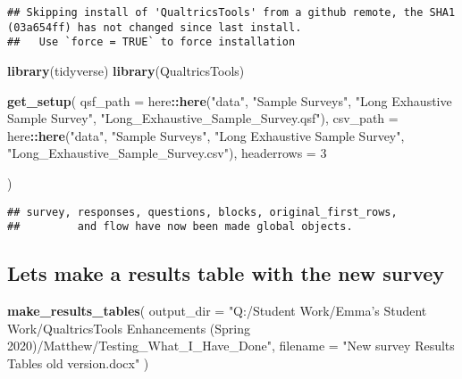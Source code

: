 \documentclass[
]{article}
\newenvironment{Shaded}{\begin{snugshade}}{\end{snugshade}}
\newcommand{\DataTypeTok}[1]{\textcolor[rgb]{0.13,0.29,0.53}{#1}}
\newcommand{\DecValTok}[1]{\textcolor[rgb]{0.00,0.00,0.81}{#1}}
\newcommand{\KeywordTok}[1]{\textcolor[rgb]{0.13,0.29,0.53}{\textbf{#1}}}
\newcommand{\NormalTok}[1]{#1}
\newcommand{\OperatorTok}[1]{\textcolor[rgb]{0.81,0.36,0.00}{\textbf{#1}}}
\newcommand{\StringTok}[1]{\textcolor[rgb]{0.31,0.60,0.02}{#1}}
\begin{document}
\begin{verbatim}
## Skipping install of 'QualtricsTools' from a github remote, the SHA1 (03a654ff) has not changed since last install.
##   Use `force = TRUE` to force installation
\end{verbatim}

\begin{Shaded}
\begin{Highlighting}[]
\KeywordTok{library}\NormalTok{(tidyverse)}
\KeywordTok{library}\NormalTok{(QualtricsTools)}

\KeywordTok{get_setup}\NormalTok{(}
  \DataTypeTok{qsf_path =}\NormalTok{ here}\OperatorTok{::}\KeywordTok{here}\NormalTok{(}\StringTok{"data"}\NormalTok{, }\StringTok{"Sample Surveys"}\NormalTok{, }\StringTok{"Long Exhaustive Sample Survey"}\NormalTok{, }\StringTok{"Long_Exhaustive_Sample_Survey.qsf"}\NormalTok{),}
  \DataTypeTok{csv_path =}\NormalTok{ here}\OperatorTok{::}\KeywordTok{here}\NormalTok{(}\StringTok{"data"}\NormalTok{, }\StringTok{"Sample Surveys"}\NormalTok{, }\StringTok{"Long Exhaustive Sample Survey"}\NormalTok{, }\StringTok{"Long_Exhaustive_Sample_Survey.csv"}\NormalTok{),}
  \DataTypeTok{headerrows =} \DecValTok{3}

\NormalTok{)}
\end{Highlighting}
\end{Shaded}

\begin{verbatim}
## survey, responses, questions, blocks, original_first_rows,
##         and flow have now been made global objects.
\end{verbatim}

\hypertarget{lets-make-a-results-table-with-the-new-survey}{%
\subsection{Lets make a results table with the new
survey}\label{lets-make-a-results-table-with-the-new-survey}}

\begin{Shaded}
\begin{Highlighting}[]
\KeywordTok{make_results_tables}\NormalTok{(}
  \DataTypeTok{output_dir =} \StringTok{"Q:/Student Work/Emma's Student Work/QualtricsTools Enhancements (Spring 2020)/Matthew/Testing_What_I_Have_Done"}\NormalTok{,}
  \DataTypeTok{filename =} \StringTok{"New survey Results Tables old version.docx"}
\NormalTok{)}
\end{Highlighting}
\end{Shaded}
\end{document}
